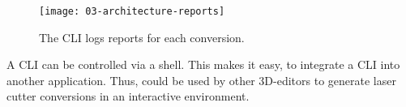 \documentclass[../../ClassicThesis.tex]{subfiles}
\begin{document}
\begin{figure}
  \centering
  \texttt{[image: 03-architecture-reports]}
  \caption{The CLI logs reports for each conversion.}
  \label{fig:reports}
\end{figure}

A CLI can be controlled via a shell. This makes it easy, to integrate a
CLI into another application. Thus, {\platener} could be used by other
3D-editors to generate laser cutter conversions in an interactive
environment.














\end{document}
